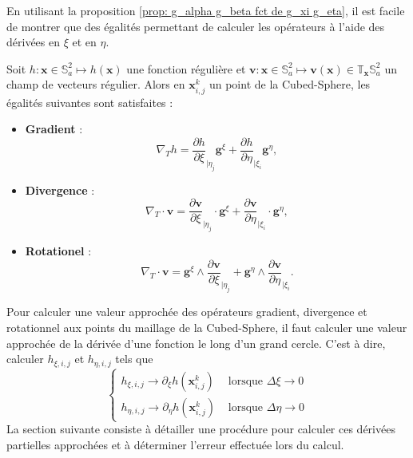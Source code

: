En utilisant la proposition \ref{prop: g_alpha g_beta fct de g_xi g_eta}, il est facile de montrer que des égalités permettant de calculer les opérateurs à l'aide des dérivées en $\xi$ et en $\eta$.

\begin{theoreme}
Soit $h : \mathbf{x} \in \mathbb{S}_a^2 \mapsto h(\mathbf{x})$ une fonction régulière et $\mathbf{v} : \mathbf{x} \in \mathbb{S}_a^2 \mapsto \mathbf{v}(\mathbf{x}) \in \mathbb{T}_{\mathbf{x}} \mathbb{S}_a^2$ un champ de vecteurs régulier. Alors en $\mathbf{x}_{i,j}^k$ un point de la Cubed-Sphere, les égalités suivantes sont satisfaites :
\begin{itemize}
\item \textbf{Gradient} :
\begin{equation}
\nabla_T h = \dfrac{\partial h}{\partial \xi}_{|\eta_j} \mathbf{g}^{\xi} + \dfrac{\partial h}{\partial \eta}_{|\xi_i} \mathbf{g}^{\eta},
\end{equation}

\item \textbf{Divergence} :
\begin{equation}
\nabla_T \cdot \mathbf{v} = \dfrac{\partial \mathbf{v}}{\partial \xi}_{|\eta_j} \cdot \mathbf{g}^{\xi} + \dfrac{\partial \mathbf{v}}{\partial \eta}_{|\xi_i} \cdot \mathbf{g}^{\eta},
\end{equation}

\item \textbf{Rotationel} :
\begin{equation}
\nabla_T \cdot \mathbf{v} = \mathbf{g}^{\xi} \wedge \dfrac{\partial \mathbf{v}}{\partial \xi}_{|\eta_j} + \mathbf{g}^{\eta} \wedge \dfrac{\partial \mathbf{v}}{\partial \eta}_{|\xi_i}.
\end{equation}
\end{itemize} 
\end{theoreme}

Pour calculer une valeur approchée des opérateurs gradient, divergence et rotationnel aux points du maillage de la Cubed-Sphere, il faut calculer une valeur approchée de la dérivée d'une fonction le long d'un grand cercle. C'est à dire, calculer $h_{\xi,i,j}$ et $h_{\eta,i,j}$ tels que 
\begin{equation}
\left\lbrace
\begin{array}{rl}
h_{\xi,i,j} \rightarrow \partial_{\xi} h ( \mathbf{x}_{i,j}^k) & \text{ lorsque } \Delta \xi \rightarrow 0\\
h_{\eta,i,j} \rightarrow \partial_{\eta} h ( \mathbf{x}_{i,j}^k) & \text{ lorsque } \Delta \eta \rightarrow 0
\end{array}
\right.
\end{equation}
La section suivante consiste à détailler une procédure pour calculer ces dérivées partielles approchées et à déterminer l'erreur effectuée lors du calcul.






